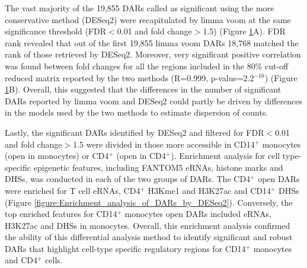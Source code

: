 \begin{figure}[htbp]
\label{figure:QC_quantile_DAR_and_DESeq2_comparison}
\end{figure} 


The vast majority of the 19,855  DARs called as significant using the more conservative method (DESeq2) were recapitulated by limma voom at the same significance threshold (FDR$<$0.01 and fold change$>$1.5) (Figure \ref{figure:QC_quantile_DAR_and_DESeq2_comparison}A). FDR rank revealed that out of the first 19,855 limma voom DARs 18,768 matched the rank of those retrieved by DESeq2. Moreover, very significant positive correlation was found between fold changes for all the regions included in the 80\% cut-off reduced matrix reported by the two methods (R=0.999, p-value=2.2$^{-16}$) (Figure \ref{figure:QC_quantile_DAR_and_DESeq2_comparison}B). Overall, this suggested that the differences in the number of significant DARs reported by limma voom and DESeq2 could partly be driven by differences in the models used by the two methods to estimate dispersion of counts. 

Lastly, the significant  DARs identified by DESeq2 and filtered for FDR$<$0.01 and fold change$>$1.5 were divided in those more accessible in CD14$^+$ monocytes  (open in monocytes) or CD4$^+$ (open in CD4$^+$). Enrichment analysis for cell type-specific epigenetic features, including FANTOM5 eRNAs, histone marks and DHSs, was conducted in each of the two groups of DARs. The CD4$^+$ open DARs were enriched for T cell eRNAs, CD4$^+$ H3Kme1 and H3K27ac and CD14$^+$ DHSs (Figure \ref{figure:Enrichment_analysis_of_DARs_by_DESeq2}). Conversely, the top enriched features for CD14$^+$ monocytes open DARs included eRNAs, H3K27ac and DHSs in monocytes. Overall, this enrichment analysis confirmed the ability of this differential analysis method to identify significant and robust DARs that highlight cell-type specific regulatory regions for CD14$^+$ monocytes and CD4$^+$ cells.

